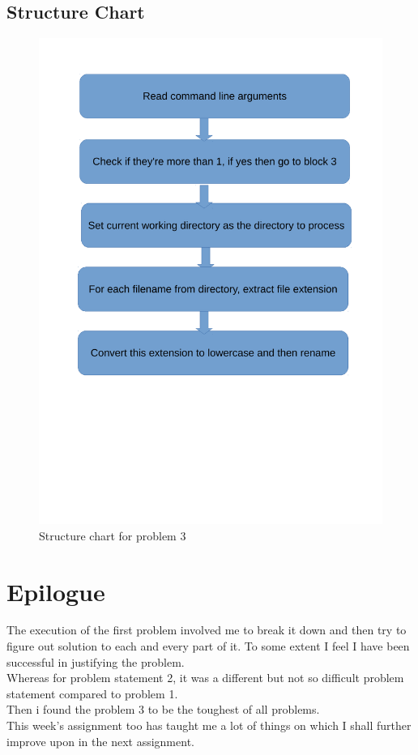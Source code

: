 \documentclass[11pt]{report}
\begin{document}
	\subsection{Structure Chart}
	\begin{figure}[h!]
	\centering
	\includegraphics[scale=0.7]{images/shots33}
	\caption{Structure chart for problem 3}	
	\end{figure}
	\pagebreak
\section{Epilogue}
The execution of the first problem involved me to break it down and then try to figure out solution to each and every part of it. To some extent I feel I have been successful in justifying the problem.\\
Whereas for problem statement 2, it was a different but not so difficult problem statement compared to problem 1. \\
Then i found the problem 3 to be the toughest of all problems.\\
This week's assignment too has taught me a lot of things on which I shall further improve upon in the next assignment.\\
 

\nocite{*}
\end{document}
